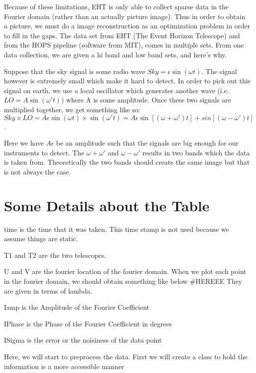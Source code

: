 \documentclass[letterpaper,10pt,english]{jupyterBook}
\begin{document}
\sphinxAtStartPar
Because of these limitations, EHT is only able to collect sparse data in the Fourier domain (rather than an actually picture image). Thus in order to obtain a picture, we must do a image reconstruction as an optimization problem in order to fill in the gaps. The data set from EHT (The Event Horizon Telescope) and from the HOPS pipeline (software from MIT), comes in multiple sets. From one data collection, we are given a hi band and low band sets, and here’s why.

\sphinxAtStartPar
Suppose that the sky signal is some radio wave \(Sky = \epsilon \sin(\omega t)\). The signal however is extremely small which make it hard to detect. In order to pick out this signal on earth, we use a local oscillator which generates another wave (i.e. \(LO = A \sin(\omega't)\)) where A is some amplitude. Once these two signals are multiplied together, we get something like so: \(Sky \times LO = A \epsilon \sin(\omega t) \times \sin(\omega' t) = A \epsilon {\sin[(\omega + \omega')t] + sin [(\omega - \omega')t]}\).

\sphinxAtStartPar
Here we have \(A \epsilon\) be an amplitude such that the signals are big enough for our instruments to detect.
The \(\omega + \omega'\) and \(\omega - \omega'\) results in two bands which the data is taken from. Theoretically the two bands should create the same image but that is not always the case.


\section{Some Details about the Table}
\label{\detokenize{data:some-details-about-the-table}}
\sphinxAtStartPar
time is the time that it was taken. This time stamp is not used because we assume things are static.

\sphinxAtStartPar
T1 and T2 are the two telescopes.

\sphinxAtStartPar
U and V are the fourier location of the fourier domain. When we plot each point in the fourier domain, we should obtain something like below \#HEREEE They are given in terms of lambda.

\sphinxAtStartPar
Iamp is the Amplitude of the Fourier Coefficient

\sphinxAtStartPar
IPhase is the Phase of the Fourier Coefficient in degrees

\sphinxAtStartPar
ISigma is the error or the noisiness of the data point

\sphinxAtStartPar
Here, we will start to preprocess the data. First we will create a class to hold the information is a more accessible manner
\end{document}
